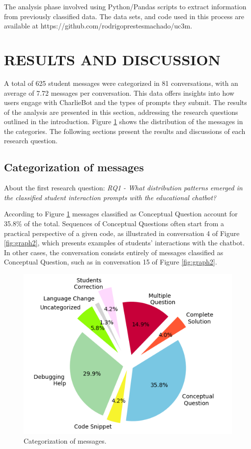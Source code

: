 \documentclass[a4paper,twoside]{article}
\begin{document}
The analysis phase involved using Python/Pandas scripts to extract information
from previously classified data. The data sets, and code used in this process
are available at https://github.com/rodrigoprestesmachado/uc3m.

\section{\uppercase{Results and Discussion}}

A total of 625 student messages were categorized in 81 conversations, with
an average of 7.72 messages per conversation. This data offers insights into how
users engage with CharlieBot and the types of prompts they submit. The results
of the analysis are presented in this section, addressing the research questions
outlined in the introduction. Figure \ref{fig:graph1} shows the distribution of
the messages in the categories. The following sections present the results and
discussions of each research question.

\subsection{Categorization of messages}

About the first research question: \textit{RQ1 - What distribution patterns
emerged in the classified student interaction prompts with the educational
chatbot?}

According to Figure \ref{fig:graph1} messages classified as
Conceptual Question account for 35.8\% of the total. Sequences of Conceptual
Questions often start from a practical perspective of a given code, as
illustrated in conversation 4 of Figure \ref{fig:graph2}, which presents
examples of students' interactions with the chatbot. In other cases, the
conversation consists entirely of messages classified as Conceptual Question,
such as in conversation 15 of Figure \ref{fig:graph2}.

\begin{figure}[h!]
  \centering
  \includegraphics[scale=0.61]{img/figure1.png}
  \caption{Categorization of messages.}
  \label{fig:graph1}
\end{figure}
\end{document}

